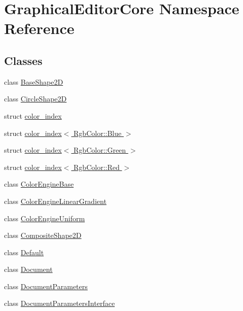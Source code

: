 \hypertarget{namespaceGraphicalEditorCore}{}\section{Graphical\+Editor\+Core Namespace Reference}
\label{namespaceGraphicalEditorCore}
\subsection*{Classes}
\begin{DoxyCompactItemize}
\item 
class \hyperlink{classGraphicalEditorCore_1_1BaseShape2D}{Base\+Shape2D}
\item 
class \hyperlink{classGraphicalEditorCore_1_1CircleShape2D}{Circle\+Shape2D}
\item 
struct \hyperlink{structGraphicalEditorCore_1_1color__index}{color\+\_\+index}
\item 
struct \hyperlink{structGraphicalEditorCore_1_1color__index_3_01RgbColor_1_1Blue_01_4}{color\+\_\+index$<$ Rgb\+Color\+::\+Blue $>$}
\item 
struct \hyperlink{structGraphicalEditorCore_1_1color__index_3_01RgbColor_1_1Green_01_4}{color\+\_\+index$<$ Rgb\+Color\+::\+Green $>$}
\item 
struct \hyperlink{structGraphicalEditorCore_1_1color__index_3_01RgbColor_1_1Red_01_4}{color\+\_\+index$<$ Rgb\+Color\+::\+Red $>$}
\item 
class \hyperlink{classGraphicalEditorCore_1_1ColorEngineBase}{Color\+Engine\+Base}
\item 
class \hyperlink{classGraphicalEditorCore_1_1ColorEngineLinearGradient}{Color\+Engine\+Linear\+Gradient}
\item 
class \hyperlink{classGraphicalEditorCore_1_1ColorEngineUniform}{Color\+Engine\+Uniform}
\item 
class \hyperlink{classGraphicalEditorCore_1_1CompositeShape2D}{Composite\+Shape2D}
\item 
class \hyperlink{classGraphicalEditorCore_1_1Default}{Default}
\item 
class \hyperlink{classGraphicalEditorCore_1_1Document}{Document}
\item 
class \hyperlink{classGraphicalEditorCore_1_1DocumentParameters}{Document\+Parameters}
\item 
class \hyperlink{classGraphicalEditorCore_1_1DocumentParametersInterface}{Document\+Parameters\+Interface}
\item 

\end{DoxyCompactItemize}
